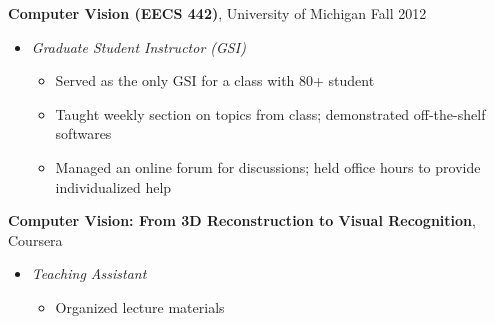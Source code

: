 \documentclass[10pt]{article}
\newenvironment{innerlist}[1][\enskip\textbullet]%
        {\begin{itemize}[#1,leftmargin=*,parsep=0pt,itemsep=0pt,topsep=0pt,partopsep=0pt]}
        {\end{itemize}}
\begin{document}
\textbf{Computer Vision (EECS 442)}, University of Michigan \hfill {Fall 2012} \\
\vspace{-.15in}
\begin{innerlist}
\item[] \emph{Graduate Student Instructor (GSI)} \\
    \vspace{-.15in}
    \begin{innerlist}
    \item Served as the only GSI for a class with 80+ student
    \item Taught weekly section on topics from class; demonstrated off-the-shelf softwares
    \item Managed an online forum for discussions; held office hours to provide individualized help
    \end{innerlist}
\end{innerlist}
\vspace{.1in}
\textbf{Computer Vision: From 3D Reconstruction to Visual Recognition}, Coursera \\
\vspace{-.15in}
\begin{innerlist}
\item[] \emph{Teaching Assistant} \\
    \vspace{-.15in}
    \begin{innerlist}
    \item Organized lecture materials
    \end{innerlist}
\end{innerlist}
%
%
\end{document}

